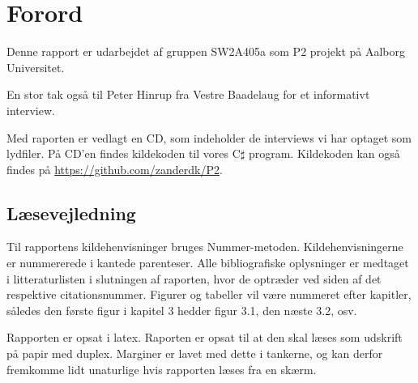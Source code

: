 \chapter*{Forord}
Denne rapport er udarbejdet af gruppen SW2A405a som P2 projekt på Aalborg Universitet.


En stor tak også til Peter Hinrup fra Vestre Baadelaug for et informativt interview.

Med raporten er vedlagt en CD, som indeholder de interviews vi har optaget som lydfiler. På CD'en findes kildekoden til vores C$\sharp$ program. Kildekoden kan også findes på \url{https://github.com/zanderdk/P2}.


\section{Læsevejledning}
Til rapportens kildehenvisninger bruges Nummer-metoden. Kildehenvisningerne er nummererede i kantede parenteser. Alle bibliografiske oplysninger er medtaget i litteraturlisten i slutningen af raporten, hvor de optræder ved siden af det respektive citationsnummer. Figurer og tabeller vil være nummeret efter kapitler, således den første figur i kapitel 3 hedder figur 3.1, den næste 3.2, osv.	

Rapporten er opsat i latex. Raporten er opsat til at den skal læses som udskrift på papir med duplex. Marginer er lavet med dette i tankerne, og kan derfor fremkomme lidt unaturlige hvis rapporten læses fra en skærm.